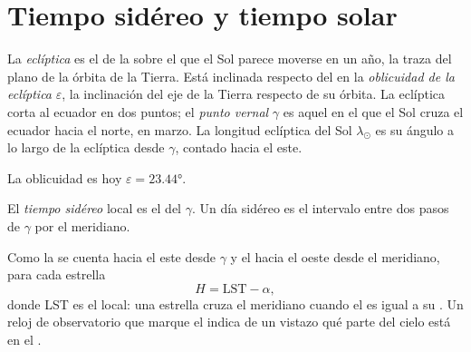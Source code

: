 \section{Tiempo sidéreo y tiempo solar}

\begin{definition}[La eclíptica]\label{def:b1:spherical-astronomy:ecliptic}
La \emph{eclíptica} es el  de la 
sobre el que el Sol parece moverse en un año, la traza del plano de la órbita de
la Tierra. Está inclinada respecto del  en la
\emph{oblicuidad de la eclíptica} $\varepsilon$,
la inclinación del eje de la Tierra respecto de su órbita. La eclíptica corta al
ecuador en dos puntos; el \emph{punto vernal} $\gamma$ es aquel
en el que el Sol cruza el ecuador hacia el norte, en marzo. La longitud eclíptica
del Sol $\lambda_\odot$ es su ángulo a lo largo de la eclíptica desde $\gamma$,
contado hacia el este.
\end{definition}

La oblicuidad es hoy $\varepsilon = \ang{23.44}$.

\begin{definition}\label{def:b1:spherical-astronomy:sidereal-time}
El \emph{tiempo sidéreo} local es el  del  $\gamma$. Un día sidéreo es el intervalo entre dos pasos de $\gamma$ por el
meridiano.
\end{definition}

Como la  se cuenta hacia el este desde $\gamma$ y el 
hacia el oeste desde el meridiano, para cada estrella
\[
  H = \mathrm{LST} - \alpha ,
\]
donde LST es el  local: una estrella cruza el meridiano cuando el
 es igual a su . Un reloj de observatorio que marque
el  indica de un vistazo qué parte del cielo está en el .


